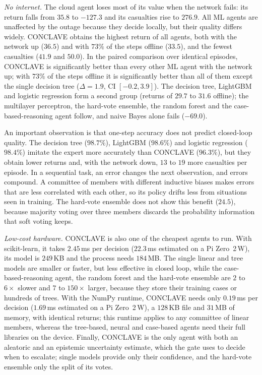 \documentclass[journal]{IEEEtran}
\begin{document}
\textit{No internet.} The cloud agent loses most of its value when the network
fails: its return falls from $35.8$ to $-127.3$ and its casualties rise to
$276.9$. All ML agents are unaffected by the outage because they decide
locally, but their quality differs widely. CONCLAVE obtains the highest return
of all agents, both with the network up ($36.5$) and with $73\%$ of the steps
offline ($33.5$), and the fewest casualties ($41.9$ and $50.0$). In the paired
comparison over identical episodes, CONCLAVE is significantly better than every
other ML agent with the network up; with $73\%$ of the steps offline it is
significantly better than all of them except the single decision tree
($\Delta=1.9$, CI $[-0.2, 3.9]$). The decision tree, LightGBM and logistic
regression form a second group (returns of $29.7$ to $31.6$ offline); the
multilayer perceptron, the hard-vote ensemble, the random forest and the
case-based-reasoning agent follow, and naive Bayes alone fails ($-69.0$).

An important observation is that one-step accuracy does not predict
closed-loop quality. The decision tree ($98.7\%$), LightGBM ($98.6\%$) and
logistic regression ($98.4\%$) imitate the expert more accurately than
CONCLAVE ($96.3\%$), but they obtain lower returns and, with the network down, $13$ to $19$ more
casualties per episode. In a sequential task, an error changes the next
observation, and errors compound. A committee of members with different
inductive biases makes errors that are less correlated with each other, so
its policy drifts less from situations seen in training. The hard-vote
ensemble does not show this benefit ($24.5$), because majority voting over
three members discards the probability information that soft voting keeps.

\textit{Low-cost hardware.} CONCLAVE is also one of the cheapest agents to run.
With scikit-learn, it takes $2.45$\,ms per decision ($22.3$\,ms estimated on a
Pi Zero~2\,W), its model is $249$\,KB and the process needs $184$\,MB. The single
linear and tree models are smaller or faster, but less effective in closed
loop, while the case-based-reasoning agent, the random forest and the
hard-vote ensemble are $2$ to $6\times$ slower and $7$ to $150\times$ larger, because
they store their training cases or hundreds of trees. With the NumPy runtime,
CONCLAVE needs only $0.19$\,ms per decision ($1.69$\,ms estimated on a Pi
Zero~2\,W), a $128$\,KB file and $31$\,MB of memory, with identical returns; this
runtime applies to any committee of linear members, whereas the tree-based,
neural and case-based agents need their full libraries on the device. Finally, CONCLAVE is the only agent with both an aleatoric
and an epistemic uncertainty estimate, which the gate uses to decide when to
escalate; single models provide only their confidence, and the hard-vote
ensemble only the split of its votes.
\end{document}
